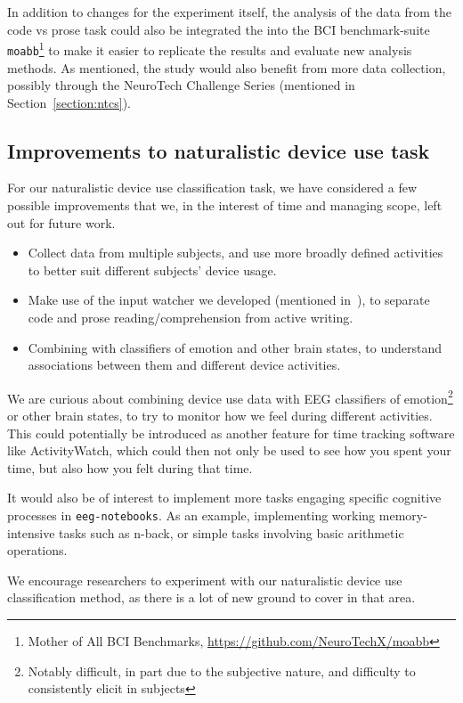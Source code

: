 In addition to changes for the experiment itself, the analysis of the data from the code vs prose task could also be integrated the into the BCI benchmark-suite \texttt{moabb}\footnote{Mother of All BCI Benchmarks, \url{https://github.com/NeuroTechX/moabb}} to make it easier to replicate the results and evaluate new analysis methods. As mentioned, the study would also benefit from more data collection, possibly through the NeuroTech Challenge Series (mentioned in Section~\ref{section:ntcs}).

\subsection{Improvements to naturalistic device use task}

For our naturalistic device use classification task, we have considered a few possible improvements that we, in the interest of time and managing scope, left out for future work. 

\begin{itemize}
    \item Collect data from multiple subjects, and use more broadly defined activities to better suit different subjects' device usage.
    \item Make use of the input watcher we developed (mentioned in~), to separate code and prose reading/comprehension from active writing.
    \item Combining with classifiers of emotion and other brain states, to understand associations between them and different device activities.
\end{itemize}

We are curious about combining device use data with EEG classifiers of emotion\footnote{Notably difficult, in part due to the subjective nature, and difficulty to consistently elicit in subjects} or other brain states, to try to monitor how we feel during different activities. This could potentially be introduced as another feature for time tracking software like ActivityWatch, which could then not only be used to see how you spent your time, but also how you felt during that time.

It would also be of interest to implement more tasks engaging specific cognitive processes in \texttt{eeg-notebooks}. As an example, implementing working memory-intensive tasks such as n-back, or simple tasks involving basic arithmetic operations.

We encourage researchers to experiment with our naturalistic device use classification method, as there is a lot of new ground to cover in that area.

